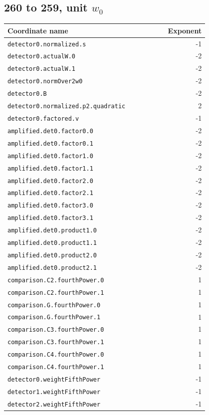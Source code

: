 \subsection*{260 to 259, unit $w_0$}
\small
\begin{longtable}{p{0.80\linewidth}r}
\toprule Coordinate name&Exponent\\\midrule\endhead
\texttt{detector0.normalized.s} & -1\\
\texttt{detector0.actualW.0} & -2\\
\texttt{detector0.actualW.1} & -2\\
\texttt{detector0.normOver2w0} & -2\\
\texttt{detector0.B} & -2\\
\texttt{detector0.normalized.p2.quadratic} & 2\\
\texttt{detector0.factored.v} & -1\\
\texttt{amplified.det0.factor0.0} & -2\\
\texttt{amplified.det0.factor0.1} & -2\\
\texttt{amplified.det0.factor1.0} & -2\\
\texttt{amplified.det0.factor1.1} & -2\\
\texttt{amplified.det0.factor2.0} & -2\\
\texttt{amplified.det0.factor2.1} & -2\\
\texttt{amplified.det0.factor3.0} & -2\\
\texttt{amplified.det0.factor3.1} & -2\\
\texttt{amplified.det0.product1.0} & -2\\
\texttt{amplified.det0.product1.1} & -2\\
\texttt{amplified.det0.product2.0} & -2\\
\texttt{amplified.det0.product2.1} & -2\\
\texttt{comparison.C2.fourthPower.0} & 1\\
\texttt{comparison.C2.fourthPower.1} & 1\\
\texttt{comparison.G.fourthPower.0} & 1\\
\texttt{comparison.G.fourthPower.1} & 1\\
\texttt{comparison.C3.fourthPower.0} & 1\\
\texttt{comparison.C3.fourthPower.1} & 1\\
\texttt{comparison.C4.fourthPower.0} & 1\\
\texttt{comparison.C4.fourthPower.1} & 1\\
\texttt{detector0.weightFifthPower} & -1\\
\texttt{detector1.weightFifthPower} & -1\\
\texttt{detector2.weightFifthPower} & -1\\
\bottomrule\end{longtable}
\normalsize
